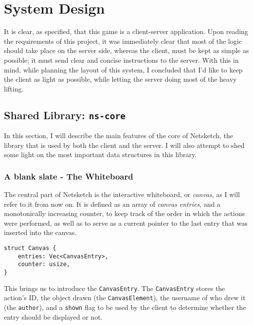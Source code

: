 \documentclass{article}
\newcommand{\code}[1]{\texttt{#1}}
\begin{document}
\newpage

\section{System Design}
It is clear, as specified, that this game is a client-server application. Upon
reading the requirements of this project, it was immediately clear that most of
the logic should take place on the server side, whereas the client, must be kept
as simple as possible; it must send clear and concise instructions to the server.
With this in mind, while planning the layout of this system, I concluded that
I'd like to keep the client as light as possible, while letting the server doing
most of the heavy lifting.

\subsection{Shared Library: \code{ns-core}}
In this section, I will describe the main features of the core of Netsketch, the library that is used by both the client and the server. I will also attempt to shed some light on the most important data structures in this library.

\subsubsection{A blank slate - The Whiteboard}

The central part of Netsketch is the interactive whiteboard, or \textit{canvas}, as I will
refer to it from now on. It is defined as an array of \textit{canvas entries},
and a monotonically increasing counter, to keep track of the order in which the
actions were performed, as well as to serve as a current pointer to the last
entry that was inserted into the canvas.

\begin{subbox}{}
    \begin{lstlisting}
struct Canvas {
    entries: Vec<CanvasEntry>,
    counter: usize,
}
        \end{lstlisting}
\end{subbox}

This brings us to introduce the \code{CanvasEntry}. The \code{CanvasEntry} stores the action's ID, the object drawn (the \code{CanvasElement}), the username of who drew it (the \code{author}), and a \code{shown} flag to be used by the client to determine whether the entry should be displayed or not.
\end{document}
